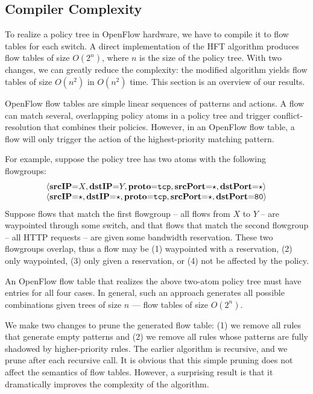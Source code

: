 \subsection{Compiler Complexity}
\label{sec:compiler-complexity}

To realize a policy tree in OpenFlow hardware, we have to compile it
to flow tables for each switch. A direct
implementation of the HFT algorithm produces flow tables of size
$O(2^n)$, where $n$ is the size of the policy tree.
With two changes, we can greatly reduce the complexity: the modified
algorithm yields flow tables of size $O(n^2)$ in $O(n^2)$ time.
This section is an overview of our results. 

OpenFlow flow tables are simple linear
sequences of patterns and actions. A flow can match several,
overlapping policy atoms in a policy tree and trigger
conflict-resolution that combines their policies. However, in an
OpenFlow flow table, a flow will only trigger the action of the
highest-priority matching pattern.

For example, suppose the policy tree has two atoms with the following
flowgroups:
\[
\begin{array}{l}
\langle\textbf{srcIP}\mathord{=}X,\textbf{dstIP}\mathord{=}Y,\textbf{proto}\mathord{=}\texttt{tcp},\textbf{srcPort}\mathord{=}\star,\textbf{dstPort}\mathord{=}\star\rangle \\
\langle\textbf{srcIP}\mathord{=}\star,\textbf{dstIP}\mathord{=}\star,\textbf{proto}\mathord{=}\texttt{tcp},\textbf{srcPort}\mathord{=}\star,\textbf{dstPort}\mathord{=}\texttt{80}\rangle
\end{array}
\]
Suppose flows that match the first flowgroup -- all flows from $X$ to
$Y$ -- are waypointed through some switch, and that flows that match
the second flowgroup -- all HTTP requests -- are given some bandwidth
reservation.  These two flowgroups overlap, thus a flow may be (1)
waypointed with a reservation, (2) only waypointed, (3) only given a
reservation, or (4) not be affected by the policy.

An OpenFlow flow table that realizes the above two-atom policy tree must have
entries for all four cases. In general, such an approach generates all possible
combinations given trees of size $n$ --- \ie flow tables of size $O(2^n)$.

We make two changes to prune the generated flow table: (1) we remove
all rules that generate empty patterns and (2) we remove all rules
whose patterns are fully shadowed by higher-priority rules. The
earlier algorithm is recursive, and we prune after each recursive
call.  It is obvious that this simple pruning does not affect the
semantics of flow tables. However, a surprising result is that it
dramatically improves the complexity of the algorithm.

